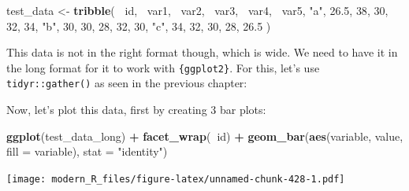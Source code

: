 \documentclass[]{gitbook}
\newenvironment{Shaded}{\begin{snugshade}}{\end{snugshade}}
\newcommand{\DataTypeTok}[1]{\textcolor[rgb]{0.13,0.29,0.53}{#1}}
\newcommand{\DecValTok}[1]{\textcolor[rgb]{0.00,0.00,0.81}{#1}}
\newcommand{\FloatTok}[1]{\textcolor[rgb]{0.00,0.00,0.81}{#1}}
\newcommand{\KeywordTok}[1]{\textcolor[rgb]{0.13,0.29,0.53}{\textbf{#1}}}
\newcommand{\NormalTok}[1]{#1}
\newcommand{\OperatorTok}[1]{\textcolor[rgb]{0.81,0.36,0.00}{\textbf{#1}}}
\newcommand{\StringTok}[1]{\textcolor[rgb]{0.31,0.60,0.02}{#1}}
\begin{document}
\begin{Shaded}
\begin{Highlighting}[]
\NormalTok{test_data <-}\StringTok{ }\KeywordTok{tribble}\NormalTok{(}
  \OperatorTok{~}\NormalTok{id, }\OperatorTok{~}\NormalTok{var1, }\OperatorTok{~}\NormalTok{var2,  }\OperatorTok{~}\NormalTok{var3, }\OperatorTok{~}\NormalTok{var4, }\OperatorTok{~}\NormalTok{var5,}
  \StringTok{"a"}\NormalTok{, }\FloatTok{26.5}\NormalTok{, }\DecValTok{38}\NormalTok{, }\DecValTok{30}\NormalTok{, }\DecValTok{32}\NormalTok{, }\DecValTok{34}\NormalTok{,}
  \StringTok{"b"}\NormalTok{, }\DecValTok{30}\NormalTok{, }\DecValTok{30}\NormalTok{, }\DecValTok{28}\NormalTok{, }\DecValTok{32}\NormalTok{, }\DecValTok{30}\NormalTok{,}
  \StringTok{"c"}\NormalTok{, }\DecValTok{34}\NormalTok{, }\DecValTok{32}\NormalTok{, }\DecValTok{30}\NormalTok{, }\DecValTok{28}\NormalTok{, }\FloatTok{26.5}
\NormalTok{)}
\end{Highlighting}
\end{Shaded}

This data is not in the right format though, which is wide. We need to have it in the long format
for it to work with \texttt{\{ggplot2\}}. For this, let's use \texttt{tidyr::gather()} as seen in the previous chapter:

\begin{Shaded}
\end{Shaded}

Now, let's plot this data, first by creating 3 bar plots:

\begin{Shaded}
\begin{Highlighting}[]
\KeywordTok{ggplot}\NormalTok{(test_data_long) }\OperatorTok{+}
\StringTok{  }\KeywordTok{facet_wrap}\NormalTok{(}\OperatorTok{~}\NormalTok{id) }\OperatorTok{+}
\StringTok{  }\KeywordTok{geom_bar}\NormalTok{(}\KeywordTok{aes}\NormalTok{(variable, value, }\DataTypeTok{fill =}\NormalTok{ variable), }\DataTypeTok{stat =} \StringTok{"identity"}\NormalTok{)}
\end{Highlighting}
\end{Shaded}

\texttt{[image: modern\_R\_files/figure-latex/unnamed-chunk-428-1.pdf]}
\end{document}
